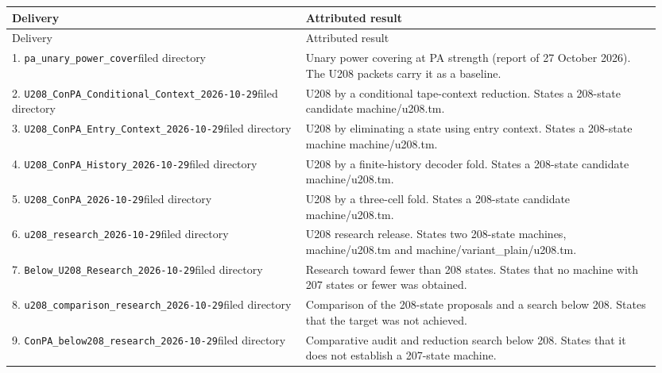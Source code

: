 \begingroup\footnotesize\setlength{\tabcolsep}{4pt}
\begin{longtable}{@{}p{0.43\linewidth}p{0.52\linewidth}@{}}
\toprule Delivery & Attributed result\\\midrule\endfirsthead
\toprule Delivery & Attributed result\\\midrule\endhead
1. \nolinkurl{pa_unary_power_cover}\newline filed directory&Unary power covering at PA strength (report of 27 October 2026). The U208 packets carry it as a baseline.\\[5pt]
2. \nolinkurl{U208_ConPA_Conditional_Context_2026-10-29}\newline filed directory&U208 by a conditional tape-context reduction. States a 208-state candidate machine/u208.tm.\\[5pt]
3. \nolinkurl{U208_ConPA_Entry_Context_2026-10-29}\newline filed directory&U208 by eliminating a state using entry context. States a 208-state machine machine/u208.tm.\\[5pt]
4. \nolinkurl{U208_ConPA_History_2026-10-29}\newline filed directory&U208 by a finite-history decoder fold. States a 208-state candidate machine/u208.tm.\\[5pt]
5. \nolinkurl{U208_ConPA_2026-10-29}\newline filed directory&U208 by a three-cell fold. States a 208-state candidate machine/u208.tm.\\[5pt]
6. \nolinkurl{u208_research_2026-10-29}\newline filed directory&U208 research release. States two 208-state machines, machine/u208.tm and machine/variant\_plain/u208.tm.\\[5pt]
7. \nolinkurl{Below_U208_Research_2026-10-29}\newline filed directory&Research toward fewer than 208 states. States that no machine with 207 states or fewer was obtained.\\[5pt]
8. \nolinkurl{u208_comparison_research_2026-10-29}\newline filed directory&Comparison of the 208-state proposals and a search below 208. States that the target was not achieved.\\[5pt]
9. \nolinkurl{ConPA_below208_research_2026-10-29}\newline filed directory&Comparative audit and reduction search below 208. States that it does not establish a 207-state machine.\\[5pt]

\end{longtable}
